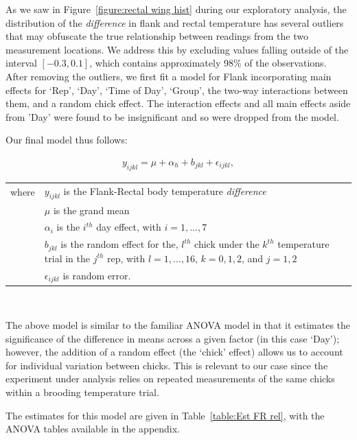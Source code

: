 \documentclass[a4paper, 10pt, titlepage]{article}
\begin{document}
\par

    As we saw in Figure~\ref{figure:rectal wing hist} during our exploratory analysis, the distribution of the \textit{difference} in flank and rectal temperature has several outliers that may obfuscate the true relationship between readings from the two measurement locations. We address this by excluding values falling outside of the interval $[-0.3, 0.1]$, which contains approximately 98\% of the observations. After removing the outliers, we first fit a model for Flank incorporating main effects for `Rep', `Day', `Time of Day', `Group', the two-way interactions between them, and a random chick effect. The interaction effects and all main effects aside from 'Day' were found to be insignificant and so were dropped from the model.
    
\par

    Our final model thus follows:
	
\begin{align}
y_{ijkl} = \mu + \alpha_h + b_{jkl} + \epsilon_{ijkl},
\end{align}
{\renewcommand{\arraystretch}{1.5}
\begin{tabular}{ll}
     where  & $y_{ijkl}$ is the Flank-Rectal body temperature \textit{difference}\\
            & $\mu$ is the grand mean\\
            & $\alpha_i$ is the $i^{th}$ day effect, with $i = 1,\dots,7$\\
            & \makecell[l]{$b_{jkl}$ is the random effect for the, $l^{th}$ chick under the $k^{th}$ temperature trial in the \\ $j^{th}$ rep, with $l = 1,\ldots,16$, $k = 0, 1, 2$, and $j = 1, 2$}\\
            & $\epsilon_{ijkl}$ is random error.
\end{tabular}\\}

The above model is similar to the familiar ANOVA model in that it estimates the significance of the difference in means across a given factor (in this case `Day'); however, the addition of a random effect (the `chick' effect) allows us to account for individual variation between chicks. This is relevant to our case since the experiment under analysis relies on repeated measurements of the same chicks within a brooding temperature trial.

    The estimates for this model are given in Table~\ref{table:Est FR rel}, with the ANOVA tables available in the appendix.
    
\end{document}
